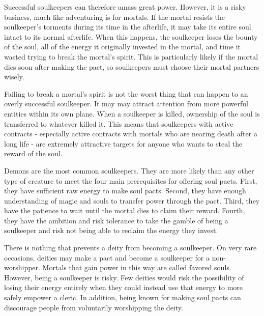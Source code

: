       Successful soulkeepers can therefore amass great power.
      However, it is a risky business, much like adventuring is for mortals.
      If the mortal resists the soulkeeper's torments during its time in the afterlife, it may take its entire soul intact to its normal afterlife.
      When this happens, the soulkeeper loses the bounty of the soul, all of the energy it originally invested in the mortal, and time it wasted trying to break the mortal's spirit.
      This is particularly likely if the mortal dies soon after making the pact, so soulkeepers must choose their mortal partners wisely.

      Failing to break a mortal's spirit is not the worst thing that can happen to an overly successful soulkeeper.
      It may may attract attention from more powerful entities within its own plane.
      When a soulkeeper is killed, ownership of the soul is transferred to whatever killed it.
      This means that soulkeepers with active contracts - especially active contracts with mortals who are nearing death after a long life - are extremely attractive targets for anyone who wants to steal the reward of the soul.

      Demons are the most common soulkeepers.
      They are more likely than any other type of creature to meet the four main prerequisites for offering soul pacts.
      First, they have sufficient raw energy to make soul pacts.
      Second, they have enough understanding of magic and souls to transfer power through the pact.
      Third, they have the patience to wait until the mortal dies to claim their reward.
      Fourth, they have the ambition and risk tolerance to take the gamble of being a soulkeeper and risk not being able to reclaim the energy they invest.

      There is nothing that prevents a deity from becoming a soulkeeper.
      On very rare occasions, deities may make a pact and become a soulkeeper for a non-worshipper.
      Mortals that gain power in this way are called favored souls.
      However, being a soulkeeper is risky.
      Few deities would risk the possibility of losing their energy entirely when they could instead use that energy to more safely empower a cleric.
      In addition, being known for making soul pacts can discourage people from voluntarily worshipping the deity.


